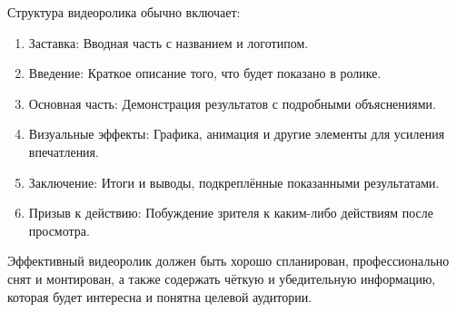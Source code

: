     Структура видеоролика обычно включает:
    \begin{enumerate}
        \item Заставка: Вводная часть с названием и логотипом.
        \item Введение: Краткое описание того, что будет показано в ролике.
        \item Основная часть: Демонстрация результатов с подробными объяснениями.
        \item Визуальные эффекты: Графика, анимация и другие элементы для усиления впечатления.
        \item Заключение: Итоги и выводы, подкреплённые показанными результатами.
        \item Призыв к действию: Побуждение зрителя к каким-либо действиям после просмотра.
    \end{enumerate}

    Эффективный видеоролик должен быть хорошо спланирован, профессионально снят и монтирован, а также содержать чёткую и убедительную информацию, которая будет интересна и понятна целевой аудитории.
    
\endinput